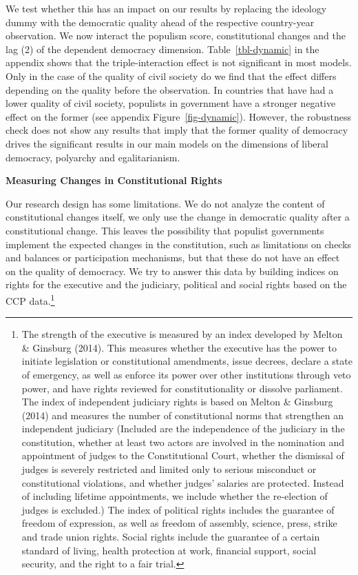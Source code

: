 \documentclass[
  abstract]{article}
\begin{document}
We test whether this has an impact on our results by replacing the
ideology dummy with the democratic quality ahead of the respective
country-year observation. We now interact the populism score,
constitutional changes and the lag (2) of the dependent democracy
dimension. Table~\ref{tbl-dynamic} in the appendix shows that the
triple-interaction effect is not significant in most models. Only in the
case of the quality of civil society do we find that the effect differs
depending on the quality before the observation. In countries that have
had a lower quality of civil society, populists in government have a
stronger negative effect on the former (see appendix
Figure~\ref{fig-dynamic}). However, the robustness check does not show
any results that imply that the former quality of democracy drives the
significant results in our main models on the dimensions of liberal
democracy, polyarchy and egalitarianism.

\textbf{Measuring Changes in Constitutional Rights}

Our research design has some limitations. We do not analyze the content
of constitutional changes itself, we only use the change in democratic
quality after a constitutional change. This leaves the possibility that
populist governments implement the expected changes in the constitution,
such as limitations on checks and balances or participation mechanisms,
but that these do not have an effect on the quality of democracy. We try
to answer this data by building indices on rights for the executive and
the judiciary, political and social rights based on the CCP
data.\footnote{The strength of the executive is measured by an index
  developed by Melton \& Ginsburg (2014). This measures whether the
  executive has the power to initiate legislation or constitutional
  amendments, issue decrees, declare a state of emergency, as well as
  enforce its power over other institutions through veto power, and have
  rights reviewed for constitutionality or dissolve parliament. The
  index of independent judiciary rights is based on Melton \& Ginsburg
  (2014) and measures the number of constitutional norms that strengthen
  an independent judiciary (Included are the independence of the
  judiciary in the constitution, whether at least two actors are
  involved in the nomination and appointment of judges to the
  Constitutional Court, whether the dismissal of judges is severely
  restricted and limited only to serious misconduct or constitutional
  violations, and whether judges' salaries are protected. Instead of
  including lifetime appointments, we include whether the re-election of
  judges is excluded.) The index of political rights includes the
  guarantee of freedom of expression, as well as freedom of assembly,
  science, press, strike and trade union rights. Social rights include
  the guarantee of a certain standard of living, health protection at
  work, financial support, social security, and the right to a fair
  trial.}
\end{document}
